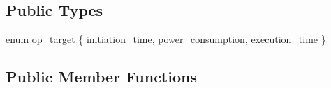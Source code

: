 \subsection*{Public Types}
\begin{DoxyCompactItemize}
\item 
enum \hyperlink{classAllocationInformation_aab74a04623ed2f1fb1708c8007a1736c}{op\+\_\+target} \{ \hyperlink{classAllocationInformation_aab74a04623ed2f1fb1708c8007a1736caf889ec701974b333538a4bb5ed0ffbc0}{initiation\+\_\+time}, 
\hyperlink{classAllocationInformation_aab74a04623ed2f1fb1708c8007a1736cabcfd2f30e54979e20d10f0b0fd7e9fea}{power\+\_\+consumption}, 
\hyperlink{classAllocationInformation_aab74a04623ed2f1fb1708c8007a1736ca313a8a90bb5240ae48bc2d2fa4c7ca42}{execution\+\_\+time}
 \}
\end{DoxyCompactItemize}
\subsection*{Public Member Functions}
